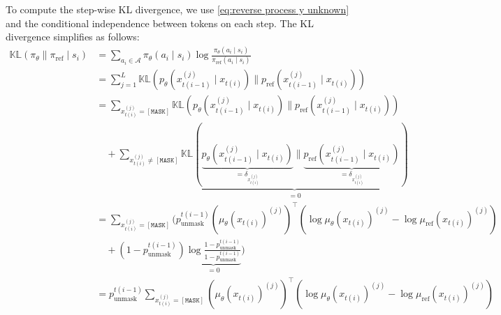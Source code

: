 To compute the step-wise KL divergence, we use \eqref{eq:reverse process y unknown} and the conditional independence between tokens on each step. The KL divergence simplifies as follows:
{\allowdisplaybreaks
    \begin{align}
        \mathbb{KL}(\pi_\theta\parallel\pi_\text{ref} \mid s_i)
         & = \sum_{a_i \in \mathcal{A}} \pi_\theta(a_i \mid s_i) \log \frac{\pi_\theta(a_i \mid s_i)}{\pi_\text{ref}(a_i \mid s_i)} \nonumber                                                                                                                                                                                 \\
         & = \sum_{j=1}^L \mathbb{KL}\left(p_\theta\left(x_{t(i - 1)}^{(j)} \mid x_{t(i)}\right) \parallel p_{\text{ref}}\left(x_{t(i - 1)}^{(j)} \mid x_{t(i)}\right)\right) \nonumber                                                                                                                                       \\
         & = \sum_{x_{t(i)}^{(j)} = [\mathtt{MASK}]} \mathbb{KL}\left(p_\theta\left(x_{t(i - 1)}^{(j)} \mid x_{t(i)}\right) \parallel p_{\text{ref}}\left(x_{t(i - 1)}^{(j)} \mid x_{t(i)}\right)\right) \nonumber                                                                                                            \\
         & \quad + \sum_{x_{t(i)}^{(j)} \neq [\mathtt{MASK}]} \underbrace{\mathbb{KL}\left(\underbrace{p_\theta\left(x_{t(i - 1)}^{(j)} \mid x_{t(i)}\right)}_{=\delta_{x_{t(i)}^{(j)}}} \parallel \underbrace{p_{\text{ref}}\left(x_{t(i - 1)}^{(j)} \mid x_{t(i)}\right)}_{=\delta_{x_{t(i)}^{(j)}}}\right)}_{=0} \nonumber \\
         & = \sum_{x_{t(i)}^{(j)} = [\mathtt{MASK}]} \bigg( p_{\text{unmask}}^{t(i - 1)} (\mu_\theta(x_{t(i)})^{(j)})^\top \left( \log \mu_\theta(x_{t(i)})^{(j)} - \log \mu_\text{ref}(x_{t(i)})^{(j)} \right) \nonumber                                                                                                     \\
         & \quad + (1 - p_{\text{unmask}}^{t(i - 1)}) \underbrace{\log \frac{1 - p_{\text{unmask}}^{t(i - 1)}}{1 - p_{\text{unmask}}^{t(i - 1)}}}_{=0} \bigg) \nonumber                                                                                                                                                       \\
         & = p_{\text{unmask}}^{t(i - 1)} \sum_{x_{t(i)}^{(j)} = [\mathtt{MASK}]} (\mu_\theta(x_{t(i)})^{(j)})^\top \left( \log \mu_\theta(x_{t(i)})^{(j)} - \log \mu_\text{ref}(x_{t(i)})^{(j)} \right)\nonumber                                                                                                             \\

\end{align}}
